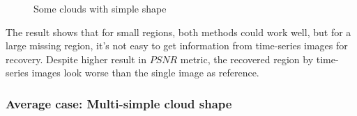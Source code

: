 \begin{figure}[]
	\centering
	\centering
	\caption{Some clouds with simple shape}
\end{figure}

The result shows that for small regions, both methods could work well, but for a large missing region, it's not easy to get information from time-series images for recovery. Despite higher result in $PSNR$ metric, the recovered region by time-series images look worse than the single image as reference.

\subsubsection{Average case: Multi-simple cloud shape}

